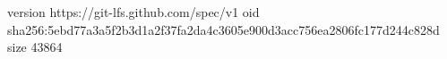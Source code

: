 version https://git-lfs.github.com/spec/v1
oid sha256:5ebd77a3a5f2b3d1a2f37fa2da4c3605e900d3acc756ea2806fc177d244c828d
size 43864

